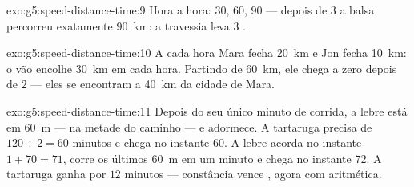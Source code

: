 \begin{solution}{exo:g5:speed-distance-time:9}
Hora a hora: $30$, $60$, $90$ --- depois de $3$  a balsa
percorreu exatamente \qty{90}{km}: a travessia leva $3$ .
\end{solution}

\begin{solution}{exo:g5:speed-distance-time:10}
A cada hora Mara fecha \qty{20}{km} e Jon fecha \qty{10}{km}: o vão
encolhe \qty{30}{km} em cada hora. Partindo de \qty{60}{km}, ele
chega a zero depois de $2$  --- eles se encontram a
\qty{40}{km} da cidade de Mara.
\end{solution}

\begin{solution}{exo:g5:speed-distance-time:11}
Depois do seu único minuto de corrida, a lebre está em \qty{60}{m}
--- na metade do caminho --- e adormece. A tartaruga precisa de
$120 \div 2 = 60$ minutos e chega no instante $60$. A lebre acorda no
instante $1 + 70 = 71$, corre os últimos \qty{60}{m} em um minuto e
chega no instante $72$. A tartaruga ganha por $12$ minutos ---
constância vence , agora com aritmética.
\end{solution}
